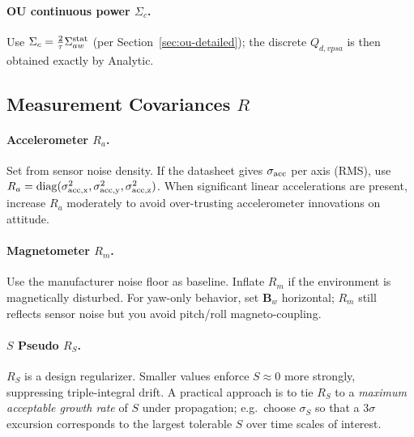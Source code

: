 \documentclass[10pt]{extarticle}
\begin{document}
\paragraph{OU continuous power $\Sigma_c$.}
Use $\Sigma_c=\frac{2}{\tau}\Sigma_{aw}^{\rm stat}$ (per Section~\ref{sec:ou-detailed});
the discrete $Q_{d,vpsa}$ is then obtained exactly by Analytic.

\subsection{Measurement Covariances $R$}
\paragraph{Accelerometer $R_a$.}
Set from sensor noise density. If the datasheet gives $\sigma_{\rm acc}$ per axis (RMS),
use $R_a=\mathrm{diag}(\sigma_{\rm acc,x}^2,\sigma_{\rm acc,y}^2,\sigma_{\rm acc,z}^2)$.
When significant linear accelerations are present, increase $R_a$ moderately to avoid
over-trusting accelerometer innovations on attitude.

\paragraph{Magnetometer $R_m$.}
Use the manufacturer noise floor as baseline. Inflate $R_m$ if the environment is 
magnetically disturbed. For yaw-only behavior, set $\bm B_w$ horizontal; $R_m$ still
reflects sensor noise but you avoid pitch/roll magneto-coupling.

\paragraph{$S$ Pseudo $R_S$.}
$R_S$ is a design regularizer. Smaller values enforce $S\!\approx 0$ more strongly,
suppressing triple-integral drift. A practical approach is to tie $R_S$ to a
\emph{maximum acceptable growth rate} of $S$ under propagation; e.g.\ choose
$\sigma_{S}$ so that a $3\sigma$ excursion corresponds to the largest tolerable $S$
over time scales of interest.
\end{document}
